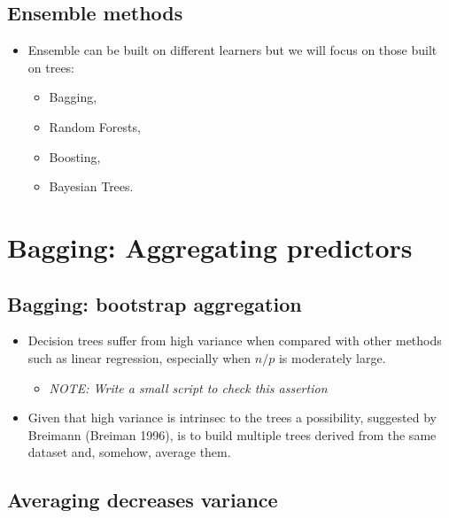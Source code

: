 \documentclass[
  letterpaper,
  DIV=11,
  numbers=noendperiod]{scrartcl}
\providecommand{\tightlist}{%
  \setlength{\itemsep}{0pt}\setlength{\parskip}{0pt}}\usepackage{longtable,booktabs,array}
\begin{document}
\hypertarget{ensemble-methods}{%
\subsection{Ensemble methods}\label{ensemble-methods}}

\begin{itemize}
\item
  Ensemble can be built on different learners but we will focus on those
  built on trees:

  \begin{itemize}
  \tightlist
  \item
    Bagging,
  \item
    Random Forests,
  \item
    Boosting,
  \item
    Bayesian Trees.
  \end{itemize}
\end{itemize}

\hypertarget{bagging-aggregating-predictors}{%
\section{Bagging: Aggregating
predictors}\label{bagging-aggregating-predictors}}

\hypertarget{bagging-bootstrap-aggregation}{%
\subsection{Bagging: bootstrap
aggregation}\label{bagging-bootstrap-aggregation}}

\begin{itemize}
\tightlist
\item
  Decision trees suffer from high variance when compared with other
  methods such as linear regression, especially when \(n/p\) is
  moderately large.

  \begin{itemize}
  \tightlist
  \item
    \emph{NOTE: Write a small script to check this assertion}
  \end{itemize}
\item
  Given that high variance is intrinsec to the trees a possibility,
  suggested by Breimann (Breiman 1996), is to build multiple trees
  derived from the same dataset and, somehow, average them.
\end{itemize}

\hypertarget{averaging-decreases-variance}{%
\subsection{Averaging decreases
variance}\label{averaging-decreases-variance}}
\end{document}
